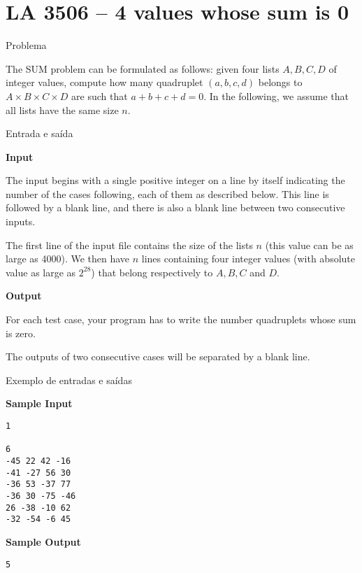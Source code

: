 \section{LA 3506 -- 4 values whose sum is 0}

\begin{frame}[fragile]{Problema}

The SUM problem can be formulated as follows: given four lists $A, B, C, D$ of integer values, 
compute how many quadruplet $(a, b, c, d)$ belongs to $A\times B\times C\times D$ are such that 
$a + b + c + d = 0$. In the following, we assume that all lists have the same size $n$.

\end{frame}

\begin{frame}[fragile]{Entrada e saída}

\textbf{Input}

The input begins with a single positive integer on a line by itself indicating the number of the 
cases following, each of them as described below. This line is followed by a blank line, and 
there is also a blank line between two consecutive inputs.

The first line of the input file contains the size of the lists $n$ (this value can be as large as 
4000).  We then have $n$ lines containing four integer values (with absolute value as large as 
$2^{28}$) that belong respectively to $A, B, C$ and $D$. 

\textbf{Output}

For each test case, your program has to write the number quadruplets whose sum is zero.

The outputs of two consecutive cases will be separated by a blank line.

\end{frame}

\begin{frame}[fragile]{Exemplo de entradas e saídas}

\begin{minipage}[t]{0.45\textwidth}
\textbf{Sample Input}
\begin{verbatim}
1

6
-45 22 42 -16
-41 -27 56 30
-36 53 -37 77
-36 30 -75 -46
26 -38 -10 62
-32 -54 -6 45
\end{verbatim}
\end{minipage}
\begin{minipage}[t]{0.5\textwidth}
\textbf{Sample Output}
\begin{verbatim}
5
\end{verbatim}
\end{minipage}
\end{frame}

